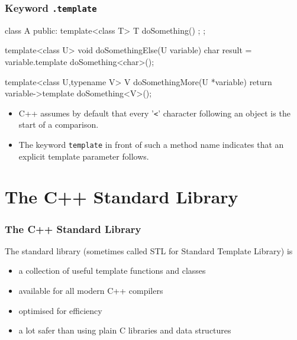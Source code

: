 \documentclass[aspectratio=169,ignorenonframetext,11pt]{beamer}
\def\inline{\lstinline[basicstyle=\small\ttfamily]}
\begin{document}

\begin{frame}[fragile,t]
\frametitle{Keyword \texttt{.template}}
\vspace*{-1em}
\begin{cppcode}
class A
{
  public:
    template<class T> T doSomething() { };
};

template<class U> void doSomethingElse(U variable)
{
    char result = variable.template doSomething<char>();
}

template<class U,typename V> V doSomethingMore(U *variable)
{
    return variable->template doSomething<V>();
}
\end{cppcode}
\begin{itemize}%
\item C++ assumes by default that every '\inline!<!' character following an object is the start of a comparison.
\item The keyword \inline!template! in front of such a method name indicates that
an explicit template parameter follows.
\end{itemize}

\end{frame}



\section{The C++ Standard Library}


\begin{frame}
\frametitle<presentation>{The C++ Standard Library}
The standard library (sometimes called STL for Standard Template Library) is
\begin{itemize}%
\item a collection of useful template functions and classes
\item available for all modern C++ compilers
\item optimised for efficiency
\item a lot safer than using plain C libraries and data structures
\end{itemize}
\end{frame}

\end{document}
